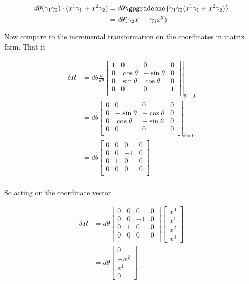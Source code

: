 \begin{align*}
d\theta (\gamma_1 \gamma_2) \cdot (x^1 \gamma_1 + x^2 \gamma_2)
&= 
d\theta \gpgradeone{ \gamma_1 \gamma_2 (x^1 \gamma_1 + x^2 \gamma_2) } \\
&= 
d\theta (\gamma_2 x^1 - \gamma_1 x^2)  \\
\end{align*}

Now compare to the incremental transformation on the coordinates in matrix form.  That is

\begin{align*}
\delta R
&=
d\theta \frac{d}{d\theta}
{
\left.
\begin{bmatrix}
1 & 0 & 0 & 0 \\
0 & \cos\theta & -\sin\theta & 0 \\
0 & \sin\theta & \cos\theta & 0 \\
0 & 0 & 0 & 1 \\
\end{bmatrix}
\right\vert}_{\theta=0} \\
&=
d\theta
{
\left.
\begin{bmatrix}
0 & 0 & 0 & 0 \\
0 & -\sin\theta & -\cos\theta & 0 \\
0 & \cos\theta & -\sin\theta & 0 \\
0 & 0 & 0 & 0 \\
\end{bmatrix}
\right\vert}_{\theta=0} \\
&=
d\theta
\begin{bmatrix}
0 & 0 & 0 & 0 \\
0 & 0 & -1 & 0 \\
0 & 1 & 0 & 0 \\
0 & 0 & 0 & 0 \\
\end{bmatrix} \\
\end{align*}

So acting on the coordinate vector

\begin{align*}
\delta R &= d\theta
\begin{bmatrix}
0 & 0 & 0 & 0 \\
0 & 0 & -1 & 0 \\
0 & 1 & 0 & 0 \\
0 & 0 & 0 & 0 \\
\end{bmatrix} 
\begin{bmatrix}
x^0 \\
x^1 \\
x^2 \\
x^3
\end{bmatrix} \\
&=
d\theta
\begin{bmatrix}
0 \\
-x^2 \\
x^1 \\
0
\end{bmatrix} \\
\end{align*}

